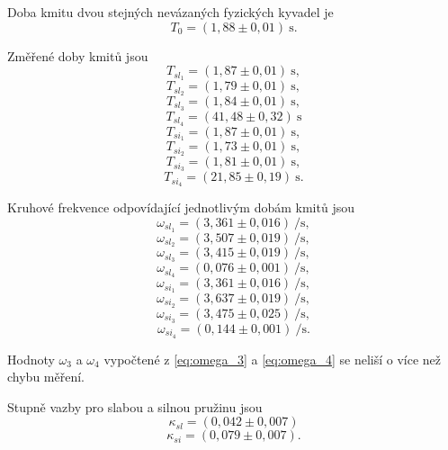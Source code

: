 \documentclass[protokol.tex]{subfiles}
\begin{document}
Doba kmitu dvou stejných nevázaných fyzických kyvadel je 
$$ T_0 = (1,88 \pm 0,01) \ \si{\second}. $$

Změřené doby kmitů jsou
$$T_{sl_1} = (1,87 \pm 0,01) \ \si{\second},$$
$$T_{sl_2} = (1,79 \pm 0,01) \ \si{\second},$$
$$T_{sl_3} = (1,84 \pm 0,01) \ \si{\second},$$
$$T_{sl_4} = (41,48 \pm 0,32) \ \si{\second}$$
$$T_{si_1} = (1,87 \pm 0,01) \ \si{\second},$$
$$T_{si_2} = (1,73 \pm 0,01) \ \si{\second},$$
$$T_{si_3} = (1,81 \pm 0,01) \ \si{\second},$$
$$T_{si_4} = (21,85 \pm 0,19) \ \si{\second}.$$

Kruhové frekvence odpovídající jednotlivým dobám kmitů jsou
$$ \omega_{sl_1} = (3,361 \pm 0,016) \ \si{\per\second}, $$
$$ \omega_{sl_2} = (3,507 \pm 0,019) \ \si{\per\second}, $$
$$ \omega_{sl_3} = (3,415 \pm 0,019) \ \si{\per\second}, $$
$$ \omega_{sl_4} = (0,076 \pm 0,001) \ \si{\per\second}, $$
$$ \omega_{si_1} = (3,361 \pm 0,016) \ \si{\per\second}, $$
$$ \omega_{si_2} = (3,637 \pm 0,019) \ \si{\per\second}, $$
$$ \omega_{si_3} = (3,475 \pm 0,025) \ \si{\per\second}, $$
$$ \omega_{si_4} = (0,144 \pm 0,001) \ \si{\per\second}. $$

Hodnoty $\omega_3$ a $\omega_4$ vypočtené z \eqref{eq:omega_3} a \eqref{eq:omega_4} se neliší o více než chybu měření.

Stupně vazby pro slabou a silnou pružinu jsou
$$ \kappa_{sl} = (0,042 \pm 0,007) $$
$$ \kappa_{si} = (0,079 \pm 0,007). $$
\end{document}
